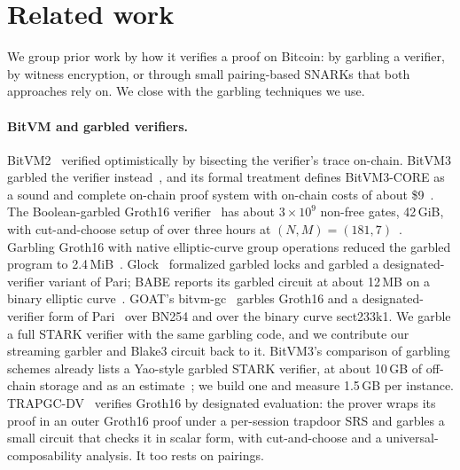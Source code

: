 \documentclass[11pt]{article}
\begin{document}
\section{Related work}\label{sec:related}

We group prior work by how it verifies a proof on Bitcoin: by garbling a verifier,
by witness encryption, or through small pairing-based SNARKs that both approaches
rely on. We close with the garbling techniques we use.

\paragraph{BitVM and garbled verifiers.} BitVM2~\cite{laa25bitvm2} verified
optimistically by bisecting the verifier's trace on-chain. BitVM3 garbled the
verifier instead~\cite{lin25bitvm3,che25sok}, and its formal treatment defines
BitVM3-CORE as a sound and complete on-chain proof system with on-chain costs of
about \$9~\cite{bitvm3paper}. The Boolean-garbled Groth16 verifier~\cite{bit25b}
has about $3\times10^9$ non-free gates, 42\,GiB, with cut-and-choose setup of over
three hours at $(N,M)=(181,7)$~\cite{babe2026}. Garbling Groth16 with native
elliptic-curve group operations reduced the garbled program to
2.4\,MiB~\cite{kflt26native}. Glock~\cite{eag25glock} formalized garbled locks and
garbled a designated-verifier variant of Pari; BABE reports its garbled circuit at
about 12\,MB on a binary elliptic curve~\cite{babe2026}. GOAT's
bitvm-gc~\cite{bitvmgc} garbles Groth16 and a designated-verifier form of
Pari~\cite{garudapari} over BN254 and over the binary curve sect233k1. We garble a
full STARK verifier with the same garbling code, and we contribute our streaming
garbler and Blake3 circuit back to it. BitVM3's comparison of garbling schemes already lists a
Yao-style garbled STARK verifier, at about 10\,GB of off-chain storage and as an
estimate~\cite[Table~9]{bitvm3paper}; we build one and measure 1.5\,GB per
instance. TRAPGC-DV~\cite{trapgcdv26} verifies Groth16 by designated evaluation:
the prover wraps its proof in an outer Groth16 proof under a per-session trapdoor
SRS and garbles a small circuit that checks it in scalar form, with
cut-and-choose and a universal-composability analysis. It too rests on pairings.
\end{document}
